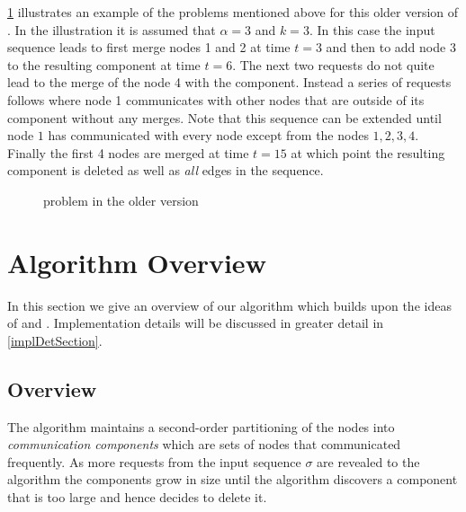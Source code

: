 \documentclass[a4paper,xcolor=dvipsnames, tikz, 12pt]{article}
\newcommand{\crep}{\text{C{\scriptsize REP}}}
\newcommand{\request}[3]{\draw (axis cs:#3,#1) -- node[left]{} (axis cs:#3,#2);}
\theoremstyle{definition}
\begin{document}
	\cref{exOldCrep} illustrates an example of the problems mentioned above for this older version of \crep{}. In the illustration it is assumed that $\alpha=3$ and $k=3$. In this case the input sequence leads \crep{} to first merge nodes 1 and 2 at time $t=3$ and then to add node 3 to the resulting component at time $t= 6$. The next two requests do not quite lead to the merge of the node 4 with the component. Instead a series of requests follows where node 1 communicates with other nodes that are outside of its component without any merges. Note that this sequence can be extended until node $1$ has communicated with every node except from the nodes $1,2,3,4$. Finally the first 4 nodes are merged at time $t=15$ at which point the resulting component is deleted as well as \textit{all} edges in the sequence. 


\begin{figure}
	\caption{problem in the older version}\label{exOldCrep}
	
\end{figure}
	
	
	
	\section{Algorithm Overview}
	In this section we give an overview of our algorithm \crep{} which builds upon the ideas of \cite{Avin2015} and \cite{Avin2015a}. Implementation details will be discussed in greater detail in \cref{implDetSection}.
	
	\subsection{Overview}
	The algorithm maintains a second-order partitioning of the nodes into \textit{communication components} which are sets of nodes that communicated frequently. As more requests from the input sequence $\sigma$ are revealed to the algorithm the components grow in size until the algorithm discovers a component that is too large and hence decides to delete it.
	
\end{document}
